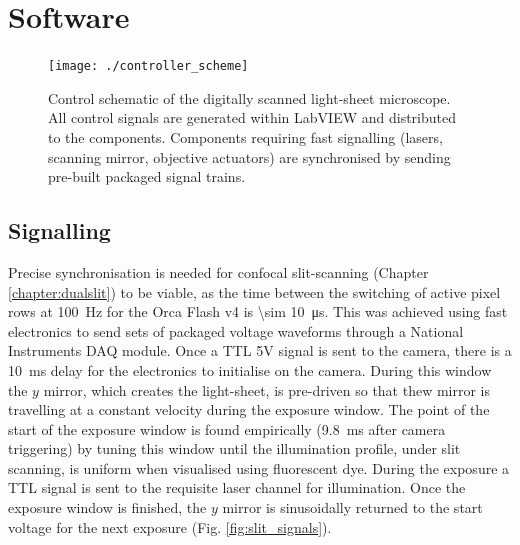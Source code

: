 
\section{Software}


\begin{figure}
    \centering
  \texttt{[image: ./controller\_scheme]} %
  \caption{Control schematic of the digitally scanned light-sheet microscope.
  All control signals are generated within LabVIEW and distributed to the components.
  Components requiring fast signalling (lasers, scanning mirror, objective actuators) are synchronised by sending pre-built packaged signal trains.}
  \label{fig:control}
\end{figure}



\subsection{Signalling} %

Precise synchronisation is needed for confocal slit-scanning (Chapter \ref{chapter:dualslit}) to be viable, as the time between the switching of active pixel rows at \SI{100}{\hertz} for the Orca Flash v4 is \SI{\sim 10}{\micro\second}. %
This was achieved using fast electronics to send sets of packaged voltage waveforms through a National Instruments DAQ module.
Once a TTL 5V signal is sent to the camera, there is a \SI{10}{\milli\second} delay for the electronics to initialise on the camera.
During this window the $y$ mirror, which creates the light-sheet, is pre-driven so that thew mirror is travelling at a constant velocity during the exposure window.
The point of the start of the exposure window is found empirically (\SI{9.8}{\milli\second} after camera triggering) by tuning this window until the illumination profile, under slit scanning, is uniform when visualised using fluorescent dye.
During the exposure a TTL signal is sent to the requisite laser channel for illumination.
Once the exposure window is finished, the $y$ mirror is sinusoidally returned to the start voltage for the next exposure (Fig. \ref{fig:slit_signals}).

